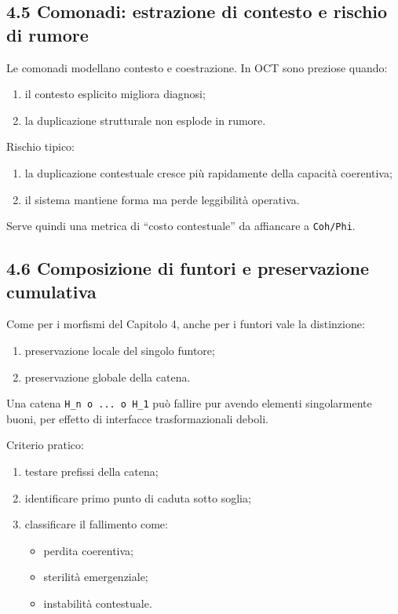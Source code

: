 \subsection{4.5 Comonadi: estrazione di contesto e rischio di rumore}

Le comonadi modellano contesto e coestrazione. In OCT sono preziose quando:

\begin{enumerate}
\def\labelenumi{\arabic{enumi}.}
\tightlist
\item
  il contesto esplicito migliora diagnosi;
\item
  la duplicazione strutturale non esplode in rumore.
\end{enumerate}

Rischio tipico:

\begin{enumerate}
\def\labelenumi{\arabic{enumi}.}
\tightlist
\item
  la duplicazione contestuale cresce più rapidamente della capacità coerentiva;
\item
  il sistema mantiene forma ma perde leggibilità operativa.
\end{enumerate}

Serve quindi una metrica di ``costo contestuale'' da affiancare a \texttt{Coh/Phi}.

\subsection{4.6 Composizione di funtori e preservazione cumulativa}

Come per i morfismi del Capitolo 4, anche per i funtori vale la distinzione:

\begin{enumerate}
\def\labelenumi{\arabic{enumi}.}
\tightlist
\item
  preservazione locale del singolo funtore;
\item
  preservazione globale della catena.
\end{enumerate}

Una catena \texttt{H\_n\ o\ ...\ o\ H\_1} può fallire pur avendo elementi singolarmente buoni, per effetto di interfacce trasformazionali deboli.

Criterio pratico:

\begin{enumerate}
\def\labelenumi{\arabic{enumi}.}
\tightlist
\item
  testare prefissi della catena;
\item
  identificare primo punto di caduta sotto soglia;
\item
  classificare il fallimento come:

  \begin{itemize}
  \tightlist
  \item
    perdita coerentiva;
  \item
    sterilità emergenziale;
  \item
    instabilità contestuale.
  \end{itemize}
\end{enumerate}

